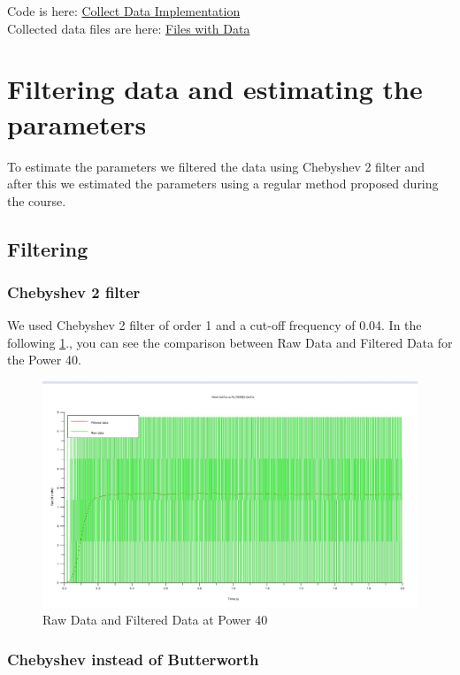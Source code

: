 \documentclass[a4paper,12pt,oneside]{article}
\begin{document}
Code is here: \href{https://github.com/etumanov/AppliedRoboticsUNITN/tree/master/DeliverableNI}{Collect Data Implementation}\\
Collected data files are here: \href{https://github.com/etumanov/AppliedRoboticsUNITN/tree/master/DeliverableNI}{Files with Data}

\section{Filtering data and estimating the parameters}
To estimate the parameters we filtered the data using Chebyshev 2 filter and after this we estimated the parameters using a regular method proposed during the course.
\subsection {Filtering}
\subsubsection {Chebyshev 2 filter}
We used Chebyshev 2 filter of order 1 and a cut-off frequency of 0.04.
In the following \cref{fig:D11}., you can see the comparison between Raw Data and Filtered Data for the Power 40.

\begin{figure}[h]%
	\centering
	\includegraphics[keepaspectratio=true, width=15cm]{D11.jpg}
	\caption{Raw Data and Filtered Data at Power 40}%
	\label{fig:D11}%
\end{figure}


\subsubsection {Chebyshev instead of Butterworth}
\end{document}
